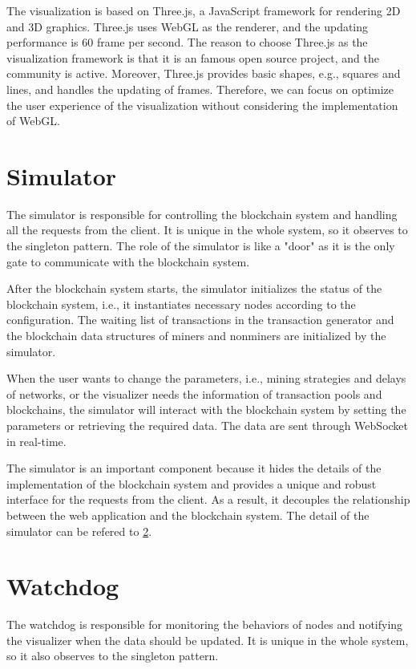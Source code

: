 The visualization is based on Three.js, a JavaScript framework for rendering 2D and 3D graphics. Three.js uses WebGL as the renderer, and the updating performance is 60 frame per second. The reason to choose Three.js as the visualization framework is that it is an famous open source project, and the community is active. Moreover, Three.js provides basic shapes, e.g., squares and lines, and handles the updating of frames. Therefore, we can focus on optimize the user experience of the visualization without considering the implementation of WebGL.

\section{Simulator}

The simulator is responsible for controlling the blockchain system and handling all the requests from the client. It is unique in the whole system, so it observes to the singleton pattern. The role of the simulator is like a "door" as it is the only gate to communicate with the blockchain system.

After the blockchain system starts, the simulator initializes the status of the blockchain system, i.e., it instantiates necessary nodes according to the configuration. The waiting list of transactions in the transaction generator and the blockchain data structures of miners and nonminers are initialized by the simulator. 

When the user wants to change the parameters, i.e., mining strategies and delays of networks, or the visualizer needs the information of transaction pools and blockchains, the simulator will interact with the blockchain system by setting the parameters or retrieving the required data. The data are sent through WebSocket in real-time.

The simulator is an important component because it hides the details of the implementation of the blockchain system and provides a unique and robust interface for the requests from the client. As a result, it decouples the relationship between the web application and the blockchain system. The detail of the simulator can be refered to \ref{}.

\section{Watchdog}

The watchdog is responsible for monitoring the behaviors of nodes and notifying the visualizer when the data should be updated. It is unique in the whole system, so it also observes to the singleton pattern.

